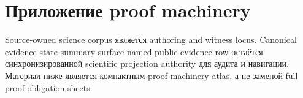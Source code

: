 \section{Приложение proof machinery}
\label{sec:oc13-proof-machinery-appendix-ru}

Source-owned science corpus является authoring and witness locus. Canonical
evidence-state summary surface
named public evidence row
остаётся синхронизированной scientific projection authority для аудита и
навигации. Материал ниже является компактным proof-machinery atlas, а не
заменой full proof-obligation sheets.

\begingroup
\footnotesize
\RaggedRight
\sloppy
\setlength{\tabcolsep}{2pt}
\setlength{\LTleft}{0pt}
\setlength{\LTright}{0pt}

\endgroup
